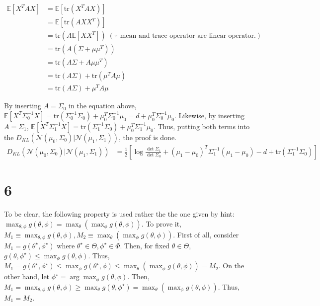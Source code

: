 \documentclass[10pt]{article}
\begin{document}
\begin{align*}
    \mathbb{E}\left[X^TA X\right] &= \mathbb{E}\left[\text{tr}(X^TAX)\right] \\
    &= \mathbb{E}\left[\text{tr}(AXX^T)\right]\\
    &= \text{tr}\left(A\mathbb{E}[XX^T]\right) \; (\because \text{ mean and trace operator are linear operator.})\\
    &= \text{tr}\left(A(\Sigma + \mu\mu^T)\right) \\
    &= \text{tr}\left(A\Sigma + A\mu\mu^T\right) \\
    &= \text{tr}(A\Sigma) + \text{tr}(\mu^TA\mu) \\
    &= \text{tr}(A\Sigma) + \mu^TA\mu
\end{align*}

By inserting $A = \Sigma_0$ in the equation above, $\mathbb{E}[X^T\Sigma_0^{-1}X] = \text{tr}(\Sigma_0^{-1}\Sigma_0) + \mu_0^T\Sigma_0^{-1}\mu_0 = d + \mu_0^T\Sigma_0^{-1}\mu_0$. Likewise, by inserting $A = \Sigma_1$, $\mathbb{E}[X^T\Sigma_1^{-1}X] = \text{tr}(\Sigma_1^{-1}\Sigma_0) + \mu_0^T\Sigma_1^{-1}\mu_0$.
Thus, putting both terms into the $D_{KL}(\mathcal{N}(\mu_0, \Sigma_0)|\mathcal{N}(\mu_1, \Sigma_1))$, the proof is done.
\begin{align*}
    D_{KL}(\mathcal{N}(\mu_0, \Sigma_0)|\mathcal{N}(\mu_1, \Sigma_1)) &= \frac{1}{2}\left[\log\frac{\det \Sigma_1}{\det \Sigma_0} + (\mu_1 - \mu_0)^T\Sigma_1^{-1}(\mu_1 - \mu_0) - d + \text{tr}\left(\Sigma_1^{-1}\Sigma_0\right)\right] 
\end{align*}
\section*{6}
To be clear, the following property is used rather the the one given by hint: $\max_{\theta,\phi}g(\theta,\phi) = \max_{\theta}\left(\max_{\phi}g(\theta,\phi)\right)$.
To prove it, $M_1 \equiv \max_{\theta,\phi}g(\theta,\phi), M_2 \equiv \max_{\theta}\left(\max_{\phi}g(\theta,\phi)\right)$.
First of all, consider $M_1  = g(\theta^\star, \phi^\star)$ where $\theta^\star \in \Theta, \phi^\star \in \Phi$.
Then, for fixed $\theta \in \Theta$, $g(\theta, \phi^\star) \le \max_\phi g(\theta, \phi)$. 
Thus, $M_1 = g(\theta^\star,\phi^\star) \le \max_\phi g(\theta^\star, \phi) \le \max_\theta(\max_\phi g(\theta,\phi)) = M_2$.
On the other hand, let $\phi^\star = \arg\max_\phi g(\theta,\phi)$. Then, $M_1 = \max_{\theta, \phi} g(\theta, \phi) \ge \max_\theta g(\theta, \phi^\star) = \max_\theta(\max_\phi g(\theta, \phi))$. Thus, $M_1 = M_2$.
\end{document}
